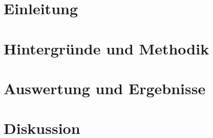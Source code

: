 \documentclass[a4paper,11pt,twoside,onecolumn,openright,final]{memoir} %
\begin{document}
\frontmatter




\newpage
\thispagestyle{empty}
\quad
\newpage
\thispagestyle{empty}
\tableofcontents  %
\listoffigures    %
\newpage

\mainmatter %



\part{Einleitung}


\part{Hintergründe und Methodik}



\part{Auswertung und Ergebnisse}



\part{Diskussion}





\end{document}
